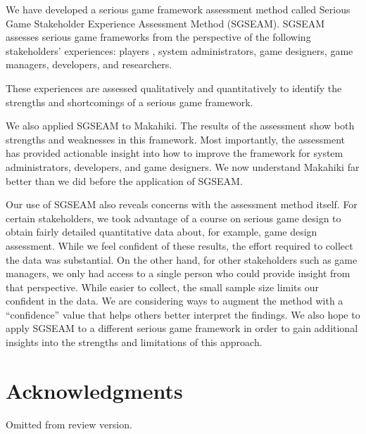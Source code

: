 \documentclass{sigchi}
\begin{document}
We have developed a serious game framework assessment method called Serious Game
Stakeholder Experience Assessment Method (SGSEAM). SGSEAM assesses serious game
frameworks from the perspective of the following stakeholders' experiences: players
, system administrators, game designers, game managers, developers, and researchers.

These experiences are assessed qualitatively and quantitatively to identify the strengths and
 shortcomings of a serious game framework.

We also applied SGSEAM to Makahiki. The results of the assessment show both strengths and
weaknesses in this framework.  Most importantly, the assessment has provided actionable
insight into how to improve the framework for system administrators, developers, and game
designers.  We now understand Makahiki far better than we did before the application of
SGSEAM.

Our use of SGSEAM also reveals concerns with the assessment method itself.  For certain
stakeholders, we took advantage of a course on serious game design to obtain fairly
detailed quantitative data about, for example, game design assessment.  While we feel
confident of these results, the effort required to collect the data was substantial.  On
the other hand, for other stakeholders such as game managers, we only had access to a
single person who could provide insight from that perspective.  While easier to collect,
the small sample size limits our confident in the data.  We are considering ways to
augment the method with a ``confidence'' value that helps others better interpret the
findings.  We also hope to apply SGSEAM to a different serious game framework in order to
gain additional insights into the strengths and limitations of this approach.

\section{Acknowledgments}
Omitted from review version.


%
%
%
%
%
\balance



\end{document}
